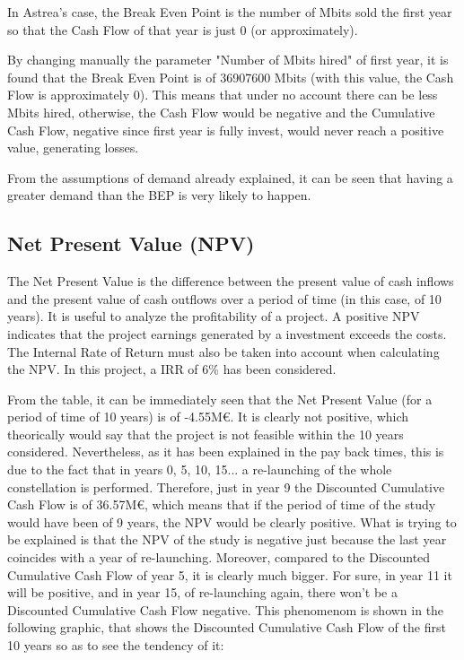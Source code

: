 In Astrea's case, the Break Even Point is the number of Mbits sold the first year so that the Cash Flow of that year is just 0 (or approximately). 

By changing manually the parameter "Number of Mbits hired" of first year, it is found that the Break Even Point is of 36907600 Mbits (with this value, the Cash Flow is approximately 0). This means that under no account there can be less Mbits hired, otherwise, the Cash Flow would be negative and the Cumulative Cash Flow, negative since first year is fully invest, would never reach a positive value, generating losses. 

From the assumptions of demand already explained, it can be seen that having a greater demand than the BEP is very likely to happen. 

\subsection{Net Present Value (NPV)}
The Net Present Value is the difference between the present value of cash inflows and the present value of cash outflows over a period of time (in this case, of 10 years). It is useful to analyze the profitability of a project. A positive NPV indicates that the project earnings generated by a investment exceeds the costs. The Internal Rate of Return must also be taken into account when calculating the NPV. In this project, a IRR of 6\% has been considered.

From the table, it can be immediately seen that the Net Present Value (for a period of time of 10 years) is of -4.55M\euro. It is clearly not positive, which theorically would say that the project is not feasible within the 10 years considered. Nevertheless, as it has been explained in the pay back times, this is due to the fact that in years 0, 5, 10, 15... a re-launching of the whole constellation is performed. Therefore, just in year 9 the Discounted Cumulative Cash Flow is of 36.57M\euro, which means that if the period of time of the study would have been of 9 years, the NPV would be clearly positive. What is trying to be explained is that the NPV of the study is negative just because the last year coincides with a year of re-launching. Moreover, compared to the Discounted Cumulative Cash Flow of year 5, it is clearly much bigger. For sure, in year 11 it will be positive, and in year 15, of re-launching again, there won't be a Discounted Cumulative Cash Flow negative. This phenomenom is shown in the following graphic, that shows the Discounted Cumulative Cash Flow of the first 10 years so as to see the tendency of it:

